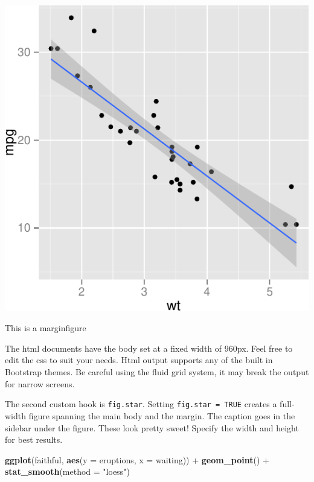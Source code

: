 \documentclass{tufte-handout}
\newenvironment{Shaded}{}{}
\newcommand{\KeywordTok}[1]{\textcolor[rgb]{0.00,0.44,0.13}{\textbf{{#1}}}}
\newcommand{\DataTypeTok}[1]{\textcolor[rgb]{0.56,0.13,0.00}{{#1}}}
\newcommand{\StringTok}[1]{\textcolor[rgb]{0.25,0.44,0.63}{{#1}}}
\newcommand{\NormalTok}[1]{{#1}}
\begin{document}
\begin{marginfigure}
 \includegraphics{./pindex_files/figure-latex/fig1}
\caption{ This is a marginfigure }
\end{marginfigure}

The html documents have the body set at a fixed width of 960px. Feel
free to edit the css to suit your needs. Html output supports any of the
built in Bootstrap themes. Be careful using the fluid grid system, it
may break the output for narrow screens.

The second custom hook is \texttt{fig.star}. Setting
\texttt{fig.star = TRUE} creates a full-width figure spanning the main
body and the margin. The caption goes in the sidebar under the figure.
These look pretty sweet! Specify the width and height for best results.

\begin{Shaded}
\begin{Highlighting}[]
\KeywordTok{ggplot}\NormalTok{(faithful, }\KeywordTok{aes}\NormalTok{(}\DataTypeTok{y =} \NormalTok{eruptions, }\DataTypeTok{x =} \NormalTok{waiting)) +}\StringTok{ }
\StringTok{    }\KeywordTok{geom_point}\NormalTok{() +}\StringTok{ }\KeywordTok{stat_smooth}\NormalTok{(}\DataTypeTok{method =} \StringTok{"loess"}\NormalTok{)}
\end{Highlighting}
\end{Shaded}
\end{document}
